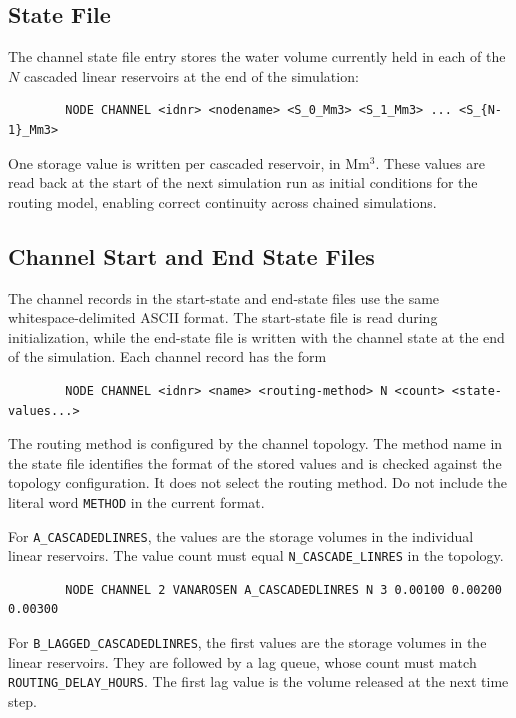 \documentclass[a4paper, 12pt]{report}
\begin{document}
	\subsection{State File}

	The channel state file entry stores the water volume currently held in each of the $N$
	cascaded linear reservoirs at the end of the simulation:

	\begin{verbatim}
		NODE CHANNEL <idnr> <nodename> <S_0_Mm3> <S_1_Mm3> ... <S_{N-1}_Mm3>
	\end{verbatim}

	One storage value is written per cascaded reservoir, in Mm$^3$. These values are read back
	at the start of the next simulation run as initial conditions for the routing model, enabling correct continuity across chained simulations.


	\subsection{Channel Start and End State Files}

	The channel records in the start-state and end-state files use the same
	whitespace-delimited ASCII format. The start-state file is read during
	initialization, while the end-state file is written with the channel state
	at the end of the simulation. Each channel record has the form

	\begin{lstlisting}	
		NODE CHANNEL <idnr> <name> <routing-method> N <count> <state-values...>
	\end{lstlisting}


	The routing method is configured by the channel topology. The method name
	in the state file identifies the format of the stored values and is checked
	against the topology configuration. It does not select the routing method.
	Do not include the literal word \texttt{METHOD} in the current format.

	For \texttt{A\_CASCADEDLINRES}, the values are the storage volumes in the
	individual linear reservoirs. The value count must equal
	\texttt{N\_CASCADE\_LINRES} in the topology.

	\begin{lstlisting}
		NODE CHANNEL 2 VANAROSEN A_CASCADEDLINRES N 3 0.00100 0.00200 0.00300
	\end{lstlisting}


	For \texttt{B\_LAGGED\_CASCADEDLINRES}, the first values are the storage
	volumes in the linear reservoirs. They are followed by a lag queue, whose
	count must match \texttt{ROUTING\_DELAY\_HOURS}. The first lag value is the
	volume released at the next time step.
\end{document}

